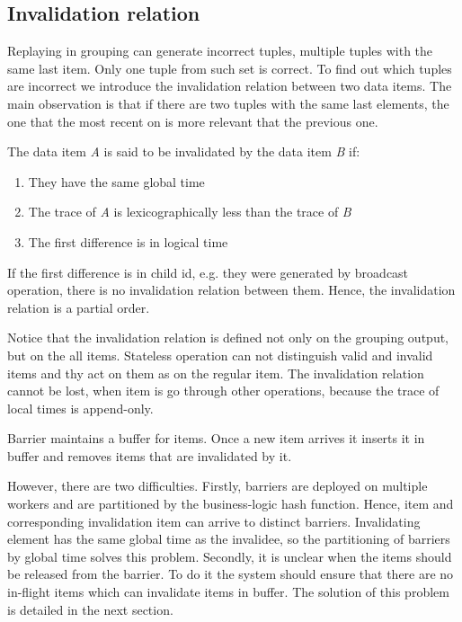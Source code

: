 \subsection{Invalidation relation}

Replaying in grouping can generate incorrect tuples, multiple tuples with the same last item. Only one tuple from such set is correct. To find out which tuples are incorrect we introduce the invalidation relation between two data items. The main observation is that if there are two tuples with the same last elements, the one that the most recent on is more relevant that the previous one. 

The data item {\it A} is said to be invalidated by the data item {\it B} if:

\begin{enumerate}
\item They have the same global time
\item The trace of {\it A} is lexicographically less than the trace of {\it B}
\item The first difference is in logical time
\end{enumerate}

If the first difference is in child id, e.g. they were generated by broadcast operation, there is no invalidation relation between them. Hence, the invalidation relation is a partial order. 

Notice that the invalidation relation is defined not only on the grouping output, but on the all items. Stateless operation can not distinguish valid and invalid items and thy act on them as on the regular item. The invalidation relation cannot be lost, when item is go through other operations, because the trace of local times is append-only.

Barrier maintains a buffer for items. Once a new item arrives it inserts it in buffer and removes items that are invalidated by it.

However, there are two difficulties. Firstly, barriers are deployed on multiple workers and are partitioned by the business-logic hash function. Hence, item and corresponding invalidation item can arrive to distinct barriers. Invalidating element has the same global time as the invalidee, so the partitioning of barriers by global time solves this problem. Secondly, it is unclear when the items should be released from the barrier. To do it the system should ensure that there are no in-flight items which can invalidate items in buffer. The solution of this problem is detailed in the next section. 

